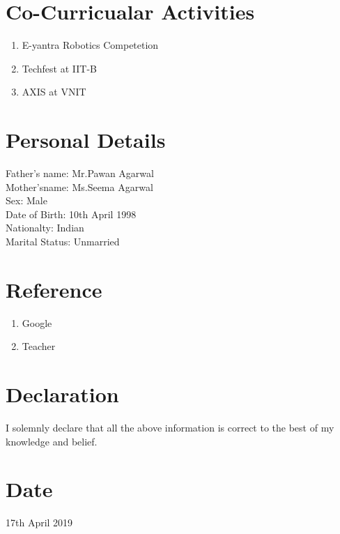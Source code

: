 \documentclass{article}
\begin{document}
\section{Co-Curricualar Activities}
\begin{enumerate}
\item E-yantra Robotics Competetion
\item Techfest at IIT-B
\item AXIS at VNIT
\end{enumerate}
\section{Personal Details}
Father's name: Mr.Pawan Agarwal \\
Mother'sname: Ms.Seema Agarwal \\
Sex: Male \\
Date of Birth: 10th April 1998\\
Nationalty: Indian\\
Marital Status: Unmarried\\
\section{Reference}
\begin{enumerate}
	\item Google
	\item Teacher
\end{enumerate}
\section{Declaration}
I solemnly declare that all the above information is correct to the best of my knowledge and belief.
\section{Date}
17th April 2019
\end{document}
